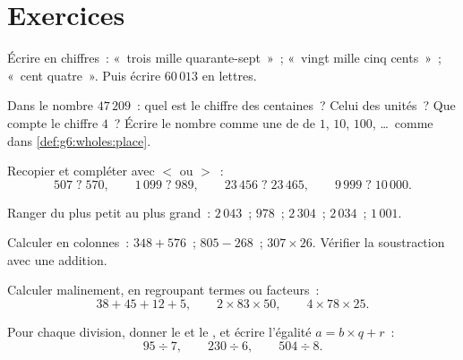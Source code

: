 \section{Exercices}

\begin{exercise}[$\star$]\label{exo:g6:wholes:1}
Écrire en chiffres~: «~trois mille quarante-sept~»~; «~vingt mille
cinq cents~»~; «~cent quatre~». Puis écrire $60\,013$ en lettres.
\end{exercise}

\begin{exercise}[$\star$]\label{exo:g6:wholes:2}
Dans le nombre $47\,209$~: quel est le chiffre des centaines~? Celui
des unités~? Que compte le chiffre $4$~? Écrire le nombre comme une
 de  de $1$, $10$, $100$, \dots\ comme dans
\cref{def:g6:wholes:place}.
\end{exercise}

\begin{exercise}[$\star$]\label{exo:g6:wholes:3}
Recopier et compléter avec $<$ ou $>$~:
\[
507 \;?\; 570, \qquad
1\,099 \;?\; 989, \qquad
23\,456 \;?\; 23\,465, \qquad
9\,999 \;?\; 10\,000 .
\]
\end{exercise}

\begin{exercise}[$\star$]\label{exo:g6:wholes:4}
Ranger du plus petit au plus grand~: $2\,043$~; $978$~; $2\,304$~;
$2\,034$~; $1\,001$.
\end{exercise}

\begin{exercise}[$\star$]\label{exo:g6:wholes:5}
Calculer en colonnes~: $348 + 576$~; \quad $805 - 268$~; \quad
$307 \times 26$. Vérifier la soustraction avec une addition.
\end{exercise}

\begin{exercise}[$\star$]\label{exo:g6:wholes:6}
Calculer malinement, en regroupant termes ou facteurs~:
\[
38 + 45 + 12 + 5, \qquad
2 \times 83 \times 50, \qquad
4 \times 78 \times 25 .
\]
\end{exercise}

\begin{exercise}[$\star$]\label{exo:g6:wholes:7}
Pour chaque division, donner le  et le , et écrire
l'égalité $a = b \times q + r$~:
\[
95 \div 7, \qquad
230 \div 6, \qquad
504 \div 8 .
\]
\end{exercise}

